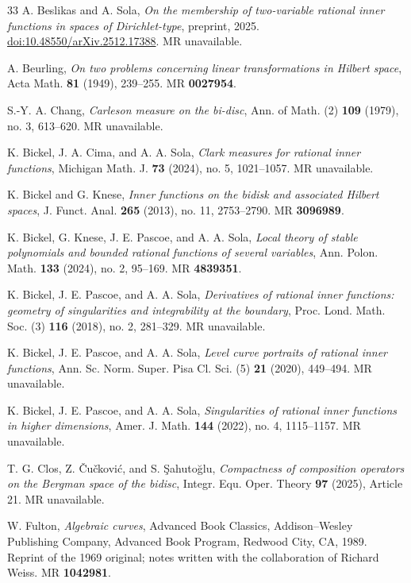 \documentclass[12pt]{amsart}
\numberwithin{equation}{section}
\begin{document}
\begin{thebibliography}{33}
A. Beslikas and A. Sola,
\textit{On the membership of two-variable rational inner functions in spaces of Dirichlet-type},
preprint, 2025.
\href{https://doi.org/10.48550/arXiv.2512.17388}{doi:10.48550/arXiv.2512.17388}.
MR unavailable.

A. Beurling,
\textit{On two problems concerning linear transformations in Hilbert space},
Acta Math. \textbf{81} (1949), 239--255.
MR \textbf{0027954}.

S.-Y. A. Chang,
\textit{Carleson measure on the bi-disc},
Ann. of Math. (2) \textbf{109} (1979), no. 3, 613--620.
MR unavailable.

K. Bickel, J. A. Cima, and A. A. Sola,
\textit{Clark measures for rational inner functions},
Michigan Math. J. \textbf{73} (2024), no. 5, 1021--1057.
MR unavailable.

K. Bickel and G. Knese,
\textit{Inner functions on the bidisk and associated Hilbert spaces},
J. Funct. Anal. \textbf{265} (2013), no. 11, 2753--2790.
MR \textbf{3096989}.

K. Bickel, G. Knese, J. E. Pascoe, and A. A. Sola,
\textit{Local theory of stable polynomials and bounded rational functions of several variables},
Ann. Polon. Math. \textbf{133} (2024), no. 2, 95--169.
MR \textbf{4839351}.

K. Bickel, J. E. Pascoe, and A. A. Sola,
\textit{Derivatives of rational inner functions: geometry of singularities and integrability at the boundary},
Proc. Lond. Math. Soc. (3) \textbf{116} (2018), no. 2, 281--329.
MR unavailable.

K. Bickel, J. E. Pascoe, and A. A. Sola,
\textit{Level curve portraits of rational inner functions},
Ann. Sc. Norm. Super. Pisa Cl. Sci. (5) \textbf{21} (2020), 449--494.
MR unavailable.

K. Bickel, J. E. Pascoe, and A. A. Sola,
\textit{Singularities of rational inner functions in higher dimensions},
Amer. J. Math. \textbf{144} (2022), no. 4, 1115--1157.
MR unavailable.

T. G. Clos, Z. \v{C}u\v{c}kovi\'c, and S. \c{S}ahuto\u{g}lu,
\textit{Compactness of composition operators on the Bergman space of the bidisc},
Integr. Equ. Oper. Theory \textbf{97} (2025), Article 21.
MR unavailable.

W. Fulton,
\textit{Algebraic curves},
Advanced Book Classics,
Addison--Wesley Publishing Company, Advanced Book Program,
Redwood City, CA, 1989.
Reprint of the 1969 original; notes written with the collaboration of Richard Weiss.
MR \textbf{1042981}.


\end{thebibliography}
\end{document}
